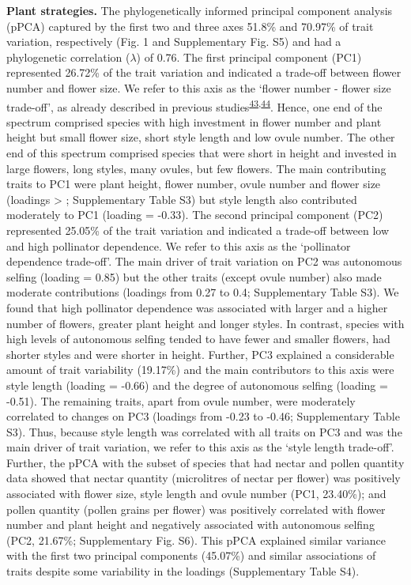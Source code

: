 \documentclass[
  12pt,
  a4paper,
]{article}
\begin{document}
\textbf{Plant strategies.} The phylogenetically informed principal component analysis (pPCA) captured by the first two and three axes 51.8\% and 70.97\% of trait variation, respectively (Fig. 1 and Supplementary Fig. S5) and had a phylogenetic correlation (\(\lambda\)) of 0.76. The first principal component (PC1) represented 26.72\% of the trait variation and indicated a trade-off between flower number and flower size. We refer to this axis as the `flower number - flower size trade-off', as already described in previous studies\textsuperscript{\protect\hyperlink{ref-sargent2007}{43},\protect\hyperlink{ref-kettle2011}{44}}. Hence, one end of the spectrum comprised species with high investment in flower number and plant height but small flower size, short style length and low ovule number. The other end of this spectrum comprised species that were short in height and invested in large flowers, long styles, many ovules, but few flowers. The main contributing traits to PC1 were plant height, flower number, ovule number and flower size (loadings \textgreater{} \textbar; Supplementary Table S3) but style length also contributed moderately to PC1 (loading = -0.33). The second principal component (PC2) represented 25.05\% of the trait variation and indicated a trade-off between low and high pollinator dependence. We refer to this axis as the `pollinator dependence trade-off'. The main driver of trait variation on PC2 was autonomous selfing (loading = 0.85) but the other traits (except ovule number) also made moderate contributions (loadings from 0.27 to 0.4; Supplementary Table S3). We found that high pollinator dependence was associated with larger and a higher number of flowers, greater plant height and longer styles. In contrast, species with high levels of autonomous selfing tended to have fewer and smaller flowers, had shorter styles and were shorter in height. Further, PC3 explained a considerable amount of trait variability (19.17\%) and the main contributors to this axis were style length (loading = -0.66) and the degree of autonomous selfing (loading = -0.51). The remaining traits, apart from ovule number, were moderately correlated to changes on PC3 (loadings from -0.23 to -0.46; Supplementary Table S3). Thus, because style length was correlated with all traits on PC3 and was the main driver of trait variation, we refer to this axis as the `style length trade-off'. Further, the pPCA with the subset of species that had nectar and pollen quantity data showed that nectar quantity (microlitres of nectar per flower) was positively associated with flower size, style length and ovule number (PC1, 23.40\%); and pollen quantity (pollen grains per flower) was positively correlated with flower number and plant height and negatively associated with autonomous selfing (PC2, 21.67\%; Supplementary Fig. S6). This pPCA explained similar variance with the first two principal components (45.07\%) and similar associations of traits despite some variability in the loadings (Supplementary Table S4).
\end{document}
